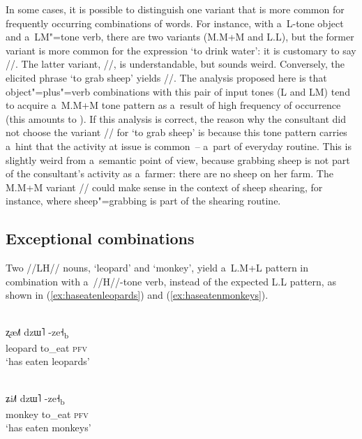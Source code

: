 In some cases, it is possible to distinguish one variant that is more common for frequently
occurring combinations of words. For instance, with a~L-tone object and a~LM"=tone verb, there are
two variants (M.M+M and L.L), but the former variant is more common for the expression ‘to drink water’: it is customary to say //. The latter variant, //, is understandable, but sounds weird.  Conversely, the elicited phrase ‘to grab sheep’ yields //. The analysis proposed here is that object"=plus"=verb combinations with this pair of input tones (L and LM) tend to acquire a~M.M+M tone pattern as a~result of high frequency of occurrence (this amounts to ). If this analysis is correct, the reason why the consultant did not choose the variant // for ‘to grab sheep’ is because this tone pattern carries a~hint that the activity at issue is common~-- a~part of everyday routine. This is slightly weird from a~semantic point of view, because grabbing sheep is not part of the consultant's activity as a~farmer: there are no sheep on her farm.  The M.M+M variant // could make sense
in the context of sheep shearing, for instance, where sheep"=grabbing is part of the shearing routine.


\subsection{Exceptional combinations}
\label{sec:exceptionalcombinations}


Two \mbox{//LH//} nouns, ‘leopard’ and ‘monkey’, yield a~L.M+L pattern in combination with a~//H//-tone verb,
instead of the expected L.L pattern, as shown in (\ref{ex:haseatenleopards}) and (\ref{ex:haseatenmonkeys}).

\begin{exe}
	\ex
	\label{ex:haseatenleopards}
	\\
	\gll ʐæ˩˥	dzɯ˥		-ze˧\textsubscript{b}\\
	leopard		to\_eat		\textsc{pfv}\\
	\glt ‘has eaten leopards’
\end{exe}

\begin{exe}
	\ex
	\label{ex:haseatenmonkeys}
	\\
	\gll ʑi˩˥	dzɯ˥		-ze˧\textsubscript{b}\\
	monkey		to\_eat		\textsc{pfv}\\
	\glt ‘has eaten monkeys’
\end{exe}

